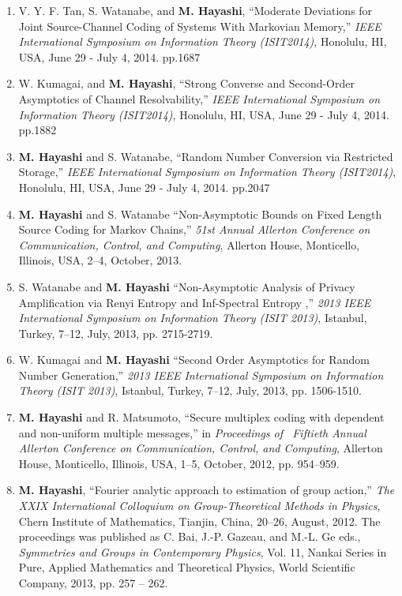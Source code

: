 \documentclass[a4paper,12pt,oneside]{article}
\begin{document}
\begin{enumerate}
    \item
    V. Y. F. Tan, S. Watanabe, and \textbf{M. Hayashi}, 
    ``Moderate Deviations for Joint Source-Channel Coding of Systems With Markovian Memory,'' 
    {\em IEEE International Symposium on Information Theory (ISIT2014)}, Honolulu, HI, USA, June 29 - July 4, 2014. pp.1687
    
    \item
    W. Kumagai, and \textbf{M. Hayashi}, 
    ``Strong Converse and Second-Order Asymptotics of Channel Resolvability,''
    {\em IEEE International Symposium on Information Theory (ISIT2014)}, Honolulu, HI, USA, June 29 - July 4, 2014. pp.1882
    
    \item
    \textbf{M. Hayashi} and S. Watanabe, 
    ``Random Number Conversion via Restricted Storage,'' 
    {\em IEEE International Symposium on Information Theory (ISIT2014)}, Honolulu, HI, USA, June 29 - July 4, 2014. pp.2047
    
    \item
    \textbf{M. Hayashi} and S. Watanabe
    ``Non-Asymptotic Bounds on Fixed Length Source Coding for Markov Chains,''
    {\em 51st Annual Allerton Conference on Communication, Control, and Computing}, 
    Allerton House, Monticello, Illinois, USA, 2--4, October, 2013.
    
    \item
    S. Watanabe and \textbf{M. Hayashi}
    ``Non-Asymptotic Analysis of Privacy Amplification via Renyi Entropy and Inf-Spectral Entropy ,'' 
    {\em 2013 IEEE International Symposium on Information Theory (ISIT 2013)}, 
    Istanbul, Turkey, 7--12, July, 2013, pp. 2715-2719.
    
    \item
    W. Kumagai and \textbf{M. Hayashi}
    ``Second Order Asymptotics for Random Number Generation,'' 
    {\em 2013 IEEE International Symposium on Information Theory (ISIT 2013)}, 
    Istanbul, Turkey, 7--12, July, 2013, pp. 1506-1510.
    
    \item \textbf{M. Hayashi} and R. Matsumoto, 
    ``Secure multiplex coding with dependent and non-uniform multiple messages,''
    in  \emph{Proceedings of \ Fiftieth Annual Allerton Conference on Communication, Control, and Computing}, 
    Allerton House, Monticello, Illinois, USA, 1--5, October, 2012, pp. 954--959.
    
    \item
    \textbf{M. Hayashi}, ``Fourier analytic approach to estimation of group action,'' 
    {\em The XXIX International Colloquium on Group-Theoretical Methods in Physics}, 
    Chern Institute of Mathematics, Tianjin, China, 20--26, August, 2012.
    The proceedings was published as 
    C. Bai, J.-P. Gazeau, and M.-L. Ge eds.,
    {\em Symmetries and Groups in Contemporary Physics},
    Vol. 11, Nankai Series in Pure, Applied Mathematics and Theoretical Physics,
    World Scientific Company, 2013, pp. 257 -- 262.
    

\end{enumerate}
\end{document}
